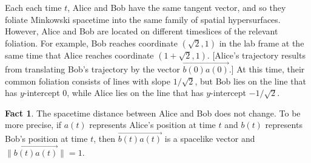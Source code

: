 \documentclass[tikz,border=10pt,fleqn]{article}
\theoremstyle{definition}
\newtheorem*{fact}{Fact}
\newcommand{\vecc}[1]{\overrightarrow{#1}}
\begin{document}
\bigskip \noindent {}

  \bigskip \noindent Each each time $t$, Alice and Bob have the same
  tangent vector, and so they foliate Minkowski spacetime into the
  same family of spatial hypersurfaces. However, Alice and Bob are
  located on different timeslices of the relevant foliation. For
  example, Bob reaches coordinate $(\sqrt{2},1)$ in the lab frame at
  the same time that Alice reaches coordinate
  $(1+\sqrt{2},1)$. [Alice's trajectory results from translating Bob's
  trajectory by the vector $\vecc{b(0)a(0)}$.]  At this time, their
  common foliation consists of lines with slope $1/\sqrt{2}$, but Bob
  lies on the line that has $y$-intercept $0$, while Alice lies on the
  line that has $y$-intercept $-1/\sqrt{2}$.

  \begin{fact} The spacetime distance between Alice and Bob does not
    change. To be more precise, if $a(t)$ represents Alice's position
    at time $t$ and $b(t)$ represents Bob's position at time $t$, then
    $\vecc{b(t)a(t)}$ is a spacelike vector and
    $\| \vecc{b(t)a(t)} \|=1$. \end{fact}
\end{document}
